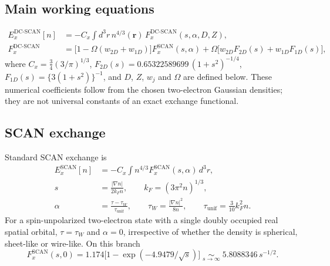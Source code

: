 \documentclass[journal=jctcce,manuscript=article]{achemso}
\begin{document}
\subsection{Main working equations}
\begin{align}
E_x^{\mathrm{DC\text{-}SCAN}}[n]&=-C_x\int d^3r\,n^{4/3}(\mathbf r)\,
F_x^{\mathrm{DC\text{-}SCAN}}(s,\alpha,D,Z),
\label{eq:dc-E}\\
F_x^{\mathrm{DC\text{-}SCAN}}&=\bigl[1-\Omega(w_{2D}+w_{1D})\bigr]F_x^{\mathrm{SCAN}}(s,\alpha)
+\Omega\bigl[w_{2D}F_{2D}(s)+w_{1D}F_{1D}(s)\bigr],
\label{eq:dc-main}
\end{align}
where $C_x=\tfrac34(3/\pi)^{1/3}$, $F_{2D}(s)=0.65322589699\,(1+s^2)^{-1/4}$,
$F_{1D}(s)=\{3(1+s^2)\}^{-1}$, and $D$, $Z$, $w_j$ and $\Omega$ are defined
below.  These numerical coefficients follow from the chosen two-electron
Gaussian densities; they are not universal constants of an exact exchange
functional.

\subsection{SCAN exchange}
Standard SCAN exchange\cite{sun2015strongly} is
\begin{align}
E_x^{\mathrm{SCAN}}[n]&=-C_x\int n^{4/3}F_x^{\mathrm{SCAN}}(s,\alpha)\,d^3r,
\label{eq:dc-scanE}\\
s&=\frac{|\nabla n|}{2k_Fn},\qquad k_F=(3\pi^2n)^{1/3},
\label{eq:dc-s}\\
\alpha&=\frac{\tau-\tau_W}{\tau_{\mathrm{unif}}},\qquad
\tau_W=\frac{|\nabla n|^2}{8n},\qquad
\tau_{\mathrm{unif}}=\frac{3}{10}k_F^2n.
\label{eq:dc-alpha}
\end{align}
For a spin-unpolarized two-electron state with a single doubly occupied real
spatial orbital, $\tau=\tau_W$ and $\alpha=0$, irrespective of whether the
density is spherical, sheet-like or wire-like.  On this branch
\begin{equation}
F_x^{\mathrm{SCAN}}(s,0)=1.174\bigl[1-\exp(-4.9479/\sqrt s)\bigr]
\;\underset{s\to\infty}{\sim}\;5.8088346\,s^{-1/2}.
\label{eq:dc-scan0}
\end{equation}
\end{document}
